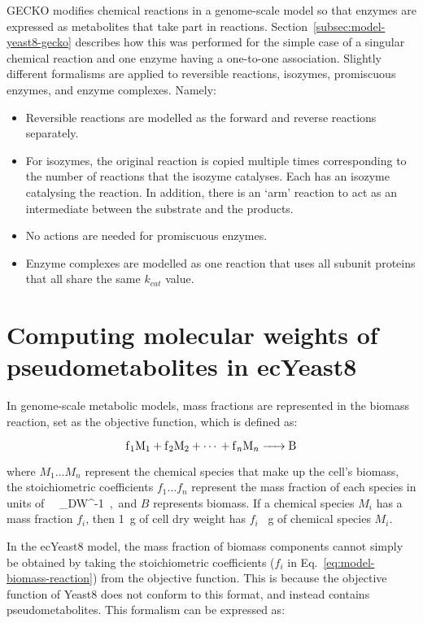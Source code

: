 GECKO modifies chemical reactions in a genome-scale model so that enzymes are expressed as metabolites that take part in reactions.
Section~\ref{subsec:model-yeast8-gecko} describes how this was performed for the simple case of a singular chemical reaction and one enzyme having a one-to-one association.
Slightly different formalisms are applied to reversible reactions, isozymes, promiscuous enzymes, and enzyme complexes.
Namely:
\begin{itemize}
  \item Reversible reactions are modelled as the forward and reverse reactions separately.
  \item For isozymes, the original reaction is copied multiple times corresponding to the number of reactions that the isozyme catalyses.
        Each has an isozyme catalysing the reaction.
        In addition, there is an `arm' reaction to act as an intermediate between the substrate and the products.
  \item No actions are needed for promiscuous enzymes.
  \item Enzyme complexes are modelled as one reaction that uses all subunit proteins that all share the same $k_{cat}$ value.
\end{itemize}


\section{Computing molecular weights of pseudometabolites in ecYeast8}
\label{append:model-molweights}

In genome-scale metabolic models, mass fractions are represented in the biomass reaction, set as the objective function, which is defined as:

\begin{equation}
  \ce{f_{1}M1 + f_{2}M2 + \cdots{} + f_{n}M_{n} -> B}
  \label{eq:model-biomass-reaction}
\end{equation}

where $M_{1} \ldots M_{n}$ represent the chemical species that make up the cell's biomass, the stoichiometric coefficients $f_{1} \ldots f_{n}$ represent the mass fraction of each species in units of \SI{}{\gram~\gram_{DW}^{-1}}, and $B$ represents biomass.
If a chemical species $M_{i}$ has a mass fraction $f_{i}$, then \SI{1}{\gram} of cell dry weight has $f_{i}$ \SI{}{\gram} of chemical species $M_{i}$.

In the ecYeast8 model, the mass fraction of biomass components cannot simply be obtained by taking the stoichiometric coefficients ($f_{i}$ in Eq.\ \ref{eq:model-biomass-reaction}) from the objective function.
This is because the objective function of Yeast8 does not conform to this format, and instead contains pseudometabolites.
This formalism can be expressed as:


